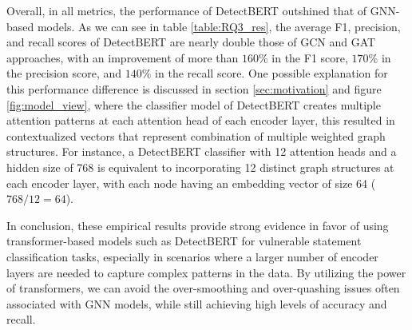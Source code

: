 \documentclass{ieeeaccess}
\begin{document}
\par Overall,  in all metrics, the performance of DetectBERT outshined that of GNN-based models. As we can see in table \ref{table:RQ3_res}, the average F1, precision, and recall scores of DetectBERT are nearly double those of GCN and GAT approaches, with an improvement of more than $160\%$ in the F1 score, $170\%$ in the precision score, and $140\%$ in the recall score.  One possible explanation for this performance difference is  discussed in section \ref{sec:motivation} and figure \ref{fig:model_view}, where the classifier model of DetectBERT creates multiple attention patterns at each attention head of each encoder layer, this resulted in contextualized vectors that represent combination of multiple weighted graph structures. For instance, a DetectBERT classifier with 12 attention heads and a hidden size of 768 is equivalent to incorporating 12 distinct graph structures at each encoder layer, with each node having an embedding vector of size 64 ($768/12 = 64$).
\par In conclusion, these empirical results provide strong evidence in favor of using transformer-based models such as DetectBERT for vulnerable statement classification tasks, especially in scenarios where a larger number of encoder layers are needed to capture complex patterns in the data. By utilizing the power of transformers, we  can avoid the over-smoothing and over-quashing issues often associated with GNN models, while still achieving high levels of accuracy and recall. 
\end{document}
